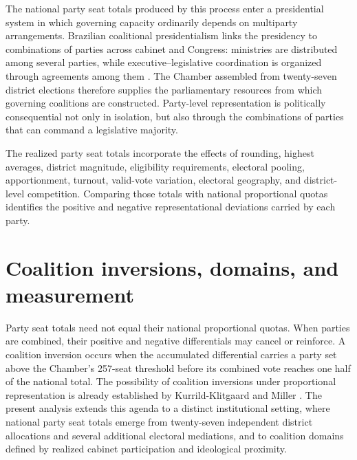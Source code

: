 \documentclass[11pt]{article}
\begin{document}
The national party seat totals produced by this process enter a presidential
system in which governing capacity ordinarily depends on multiparty
arrangements. Brazilian coalitional presidentialism links the presidency to
combinations of parties across cabinet and Congress: ministries are distributed
among several parties, while executive--legislative coordination is organized
through agreements among them
\parencite{abranches1988presidencialismo,figueiredo2000presidential}.
The Chamber assembled from twenty-seven district elections therefore supplies
the parliamentary resources from which governing coalitions are constructed.
Party-level representation is politically consequential not only in isolation,
but also through the combinations of parties that can command a legislative
majority.

 The realized party seat totals incorporate the effects of rounding,
highest averages, district magnitude, eligibility requirements, electoral
pooling, apportionment, turnout, valid-vote variation, electoral geography, and
district-level competition. Comparing those totals with national proportional
quotas identifies the positive and negative representational deviations carried
by each party.


\section{Coalition inversions, domains, and measurement}
\label{sec:mea}



Party seat totals need not equal their national proportional quotas. When parties
are combined, their positive and negative differentials may cancel or reinforce.
A coalition inversion occurs when the accumulated differential carries a party
set above the Chamber's 257-seat threshold before its combined vote reaches one
half of the national total. The possibility of coalition inversions under proportional representation is already established by Kurrild-Klitgaard \parencite{kurrild-klitgaard13_elect_inver_coalit_propor_repres} and Miller \parencite{miller14_elect_inver_under_propor_repres}. The present analysis extends this agenda to a distinct institutional setting, where national party seat totals emerge from twenty-seven independent district allocations and several additional electoral mediations, and to coalition domains defined by realized cabinet participation and ideological proximity.
\end{document}
